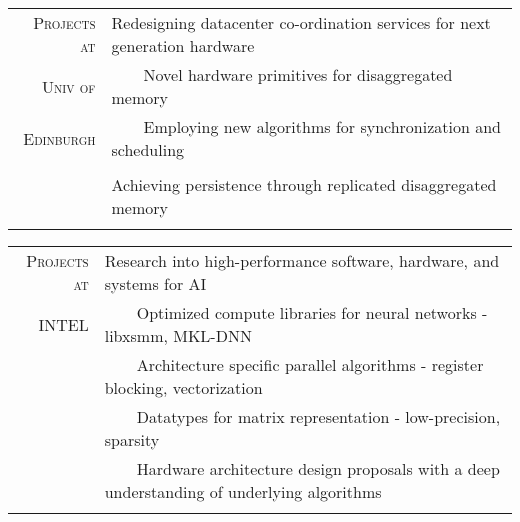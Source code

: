 \documentclass[a4paper,10pt]{article} %
\newcommand{\tabitem}{~~\llap{\textbullet}~~}
\begin{document}
\begin{tabular}{rp{12cm}}
	\textsc{Projects at} & Redesigning datacenter co-ordination services for next generation hardware \\
	\textsc{Univ of} & \tabitem Novel hardware primitives for disaggregated memory \\
	\textsc{Edinburgh}& \tabitem Employing new algorithms for synchronization and scheduling \\
	& \\
	& Achieving persistence through replicated disaggregated memory \\
	& \\
\end{tabular}


\begin{tabular}{rp{12cm}}
	\textsc{Projects at}  & Research into high-performance software, hardware, and systems for AI \\
	\textsc{INTEL} &   \tabitem Optimized compute libraries for neural networks - libxsmm, MKL-DNN \\
	& \tabitem Architecture specific parallel algorithms - register blocking, vectorization  \\
	& \tabitem Datatypes for matrix representation - low-precision, sparsity \\
	& \tabitem Hardware architecture design proposals with a deep understanding of underlying algorithms\\
	&\\
\end{tabular}
\end{document}
